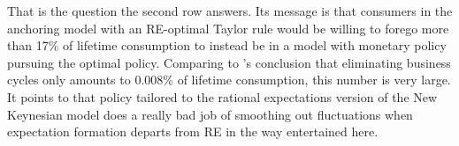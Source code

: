 \documentclass[11pt]{article}
\renewcommand{\[}{\begin{equation}}
\renewcommand{\]}{\end{equation}}
\begin{document}
That is the question the second row answers. Its message is that consumers in the anchoring model with an RE-optimal Taylor rule would be willing to forego more than 17\% of lifetime consumption to instead be in a model with monetary policy pursuing the optimal policy. Comparing to \cite{lucas1987models}'s conclusion that eliminating business cycles only amounts to 0.008\% of lifetime consumption, this number is very large. It points to that policy tailored to the rational expectations version of the New Keynesian model does a really bad job of smoothing out fluctuations when expectation formation departs from RE in the way entertained here. 

\end{document}
